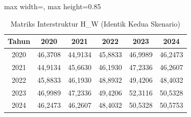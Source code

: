 \begin{table}[H]
\centering
\caption{Matriks Interstruktur H\_W (Identik Kedua Skenario)} \label{tab:apph_w}
\begin{adjustbox}{max width=\textwidth, max height=0.85\textheight}
\begin{tabular}{|c|c|c|c|c|c|}
\hline
\textbf{Tahun} & \textbf{2020} & \textbf{2021} & \textbf{2022} & \textbf{2023} & \textbf{2024} \\
\hline
2020 & 46,3708 & 44,9134 & 45,8833 & 46,9989 & 46,2473 \\
2021 & 44,9134 & 45,6630 & 46,1930 & 47,2336 & 46,2607 \\
2022 & 45,8833 & 46,1930 & 48,8932 & 49,4206 & 48,4032 \\
2023 & 46,9989 & 47,2336 & 49,4206 & 52,3116 & 50,5328 \\
2024 & 46,2473 & 46,2607 & 48,4032 & 50,5328 & 50,5753 \\
\hline
\end{tabular}
\end{adjustbox}
\end{table}